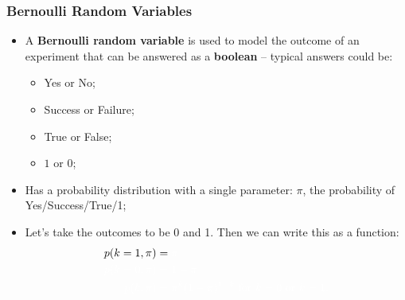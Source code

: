 \documentclass[aspectratio=169]{beamer}
\theoremstyle{principle}
\begin{document}
\begin{frame}
\frametitle{Bernoulli Random Variables}

\begin{itemize}
\item A \textbf{Bernoulli random variable} is used to model the outcome of an experiment that can be answered as a \textbf{boolean} -- typical answers could be:
\begin{itemize}
\item  Yes or No;
\item Success or Failure;
\item True or False;
\item $1$ or $0$;
\end{itemize}
\bigskip

\item Has a probability distribution with a single parameter: $\pi$, the probability of Yes/Success/True/1;
\bigskip

\item Let's take the outcomes to be 0 and 1.  Then we can write this as a function:
\begin{align*}
p(k = 1,\pi) &= \color{white}\pi\\
\color{white}p(k = 0,\pi) &\color{white}= 1 - \pi\\
\color{white}p(k,\pi) &\color{white}= \pi^k(1-\pi)^{1-k} \mbox{ for }k = 0\mbox{ or }k = 1.
\end{align*}

\end{itemize}

\end{frame}
\end{document}
